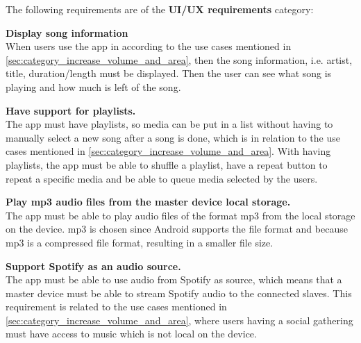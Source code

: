 The following requirements are of the \textbf{UI/UX requirements} category:
\begin{eletterate}[resume]
    \item \textbf{Display song information} \hfill\\
        When users use the app in according to the use cases mentioned in \cref{sec:category_increase_volume_and_area},
        then the song information, i.e. artist, title, duration/length must be displayed.
        Then the user can see what song is playing and how much is left of the song.

    \item \textbf{Have support for playlists.} \hfill\\ 
        The app must have playlists, so media can be put in a list without having to manually select a new song after a song is done,
        which is in relation to the use cases mentioned in \cref{sec:category_increase_volume_and_area}.
        With having playlists, the app must be able to shuffle a playlist, 
        have a repeat button to repeat a specific media and be able to queue media selected by the users.

    \item \textbf{Play mp3 audio files from the master device local storage.} \hfill\\
        The app must be able to play audio files of the format mp3 from the local storage on the device.
        mp3 is chosen since Android supports the file format and because mp3 is a compressed file format,
        resulting in a smaller file size\cite{android_mp3_support}\cite{mp3_compression}.

    \item \textbf{Support Spotify as an audio source.} \hfill\\
        The app must be able to use audio from Spotify as source,
        which means that a master device must be able to stream Spotify audio to the connected slaves.
        This requirement is related to the use cases mentioned in \cref{sec:category_increase_volume_and_area},
        where users having a social gathering must have access to music which is not local on the device.
\end{eletterate}
